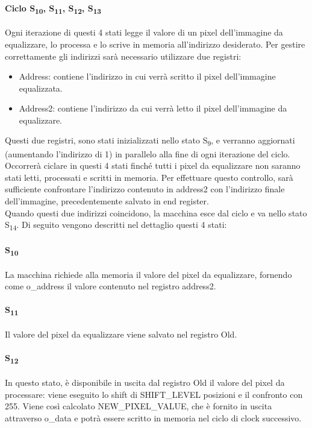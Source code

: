 \paragraph{Ciclo S\textsubscript{10}, S\textsubscript{11}, S\textsubscript{12}, S\textsubscript{13}}
Ogni iterazione di questi 4 stati legge il valore di un pixel dell'immagine da equalizzare, lo processa e lo scrive in memoria all'indirizzo desiderato.
Per gestire correttamente gli indirizzi sarà necessario utilizzare due registri:
\begin{itemize}
    \item Address: contiene l'indirizzo in cui verrà scritto il pixel dell'immagine equalizzata. %
    \item Address2: contiene l'indirizzo da cui verrà letto il pixel dell'immagine da equalizzare. %
\end{itemize}
Questi due registri, sono stati inizializzati nello stato S\textsubscript{9}, e verranno aggiornati (aumentando l'indirizzo di 1) in parallelo alla fine di ogni iterazione del ciclo.
Occorrerà ciclare in questi 4 stati finché tutti i pixel da equalizzare non saranno stati letti, processati e scritti in memoria. Per effettuare questo controllo, sarà sufficiente confrontare l'indirizzo contenuto in address2 con l'indirizzo finale dell'immagine, precedentemente salvato in end register.\\
Quando questi due indirizzi coincidono, la macchina esce dal ciclo e va nello stato S\textsubscript{14}. Di seguito vengono descritti nel dettaglio questi 4 stati:
\paragraph{S\textsubscript{10}}
La macchina richiede alla memoria il valore del pixel da equalizzare, fornendo come o\_address il valore contenuto nel registro address2.
\paragraph{S\textsubscript{11}}
Il valore del pixel da equalizzare viene salvato nel registro Old.
\paragraph{S\textsubscript{12}}
In questo stato, è disponibile in uscita dal registro Old il valore del pixel da processare: viene eseguito lo shift di SHIFT\_LEVEL posizioni e il confronto con 255. Viene così calcolato NEW\_PIXEL\_VALUE, che è fornito in uscita attraverso o\_data e potrà essere scritto in memoria nel ciclo di clock successivo.
